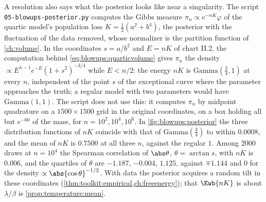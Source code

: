 \begin{refsection}
A resolution also says what the posterior looks like near a singularity. The script \texttt{05-blowups-posterior.py} computes the Gibbs measure $\pi_n\propto e^{-nK}\varphi$ of the quartic model's population loss $K=\frac12(a^2+b^4)$, the posterior with the fluctuation of the data removed, whose normalizer is the partition function of \cref{ch:volume}. In the coordinates $s=a/b^2$ and $E=nK$ of chart II.2, the computation behind \eqref{eq:blowups:quarticvolume} gives $\pi_n$ the density $\propto E^{\lambda-1}e^{-E}(1+s^2)^{-3/4}$ while $E<n/2$: the energy $nK$ is $\mathrm{Gamma}(\frac34,1)$ at every $n$, independent of the point $s$ of the exceptional curve where the parameter approaches the truth; a regular model with two parameters would have $\mathrm{Gamma}(1,1)$. The script does not use this: it computes $\pi_n$ by midpoint quadrature on a $1500\times1500$ grid in the original coordinates, on a box holding all but $e^{-60}$ of the mass, for $n=10^2,10^4,10^6$. In \cref{fig:blowups:posterior} the three distribution functions of $nK$ coincide with that of $\mathrm{Gamma}(\frac34)$ to within $0.0008$, and the mean of $nK$ is $0.7500$ at all three $n$, against the regular $1$. Among $2000$ draws at $n=10^4$ the Spearman correlation of $\abs\theta$, $\theta=\arctan s$, with $nK$ is $0.006$, and the quartiles of $\theta$ are $-1.187$, $-0.004$, $1.125$, against $\mp1.144$ and $0$ for the density $\propto\abs{\cos\theta}^{-1/2}$. With data the posterior acquires a random tilt in these coordinates (\cref{thm:toolkit:empirical,ch:freeenergy}); that $\Ewb{nK}$ is about $\lambda/\beta$ is \cref{prop:temperature:mean}.


\end{refsection}
